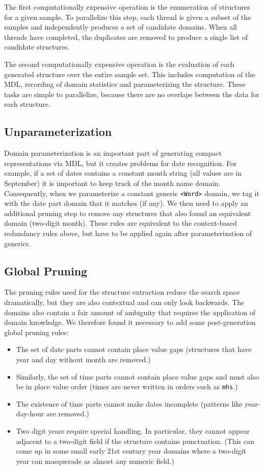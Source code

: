 The first computationally expensive operation is the enumeration of structures for a given sample. To parallelize this step, each thread is given a subset of the samples and independently produces a set of candidate domains. When all threads have completed, the duplicates are removed to produce a single list of candidate structures.

The second computationally expensive operation is the evaluation of each generated structure over the entire sample set. This includes computation of the MDL, recording of domain statistics and parameterizing the structure. These tasks are simple to parallelize, because there are no overlaps between the data for each structure.

\subsection{Unparameterization}
Domain parameterization is an important part of generating compact representations via MDL, but it creates problems for date recognition. For example, if a set of dates contains a constant month string (\eg all values are in September) it is important to keep track of the month name domain. Consequently, when we parameterize a constant generic \texttt{<Word>} domain, we tag it with the date part domain that it matches (if any). We then need to apply an additional pruning step to remove any structures that also found an equivalent domain (\eg two-digit month). These rules are equivalent to the context-based redundancy rules above, but have to be applied again after parameterization of generics.

\subsection{Global Pruning}
The pruning rules used for the structure extraction reduce the search space dramatically, but they are also contextual and can only look backwards. The domains also contain a fair amount of ambiguity that requires the application of domain knowledge. We therefore found it necessary to add some post-generation global pruning rules:
\begin{itemize}
\item The set of date parts cannot contain place value gaps (\eg structures that have year and day without month are removed.)
\item Similarly, the set of time parts cannot contain place value gaps and must also be in place value order (times are never written in orders such as \texttt{mhs}.)
\item The existence of time parts cannot make dates incomplete (\eg patterns like year-day-hour are removed.)
\item Two digit years require special handling. In particular, they cannot appear adjacent to a two-digit field if the structure contains punctuation. (This can come up in some small early 21st century year domains where a two-digit year can masquerade as almost any numeric field.)
\end{itemize}

